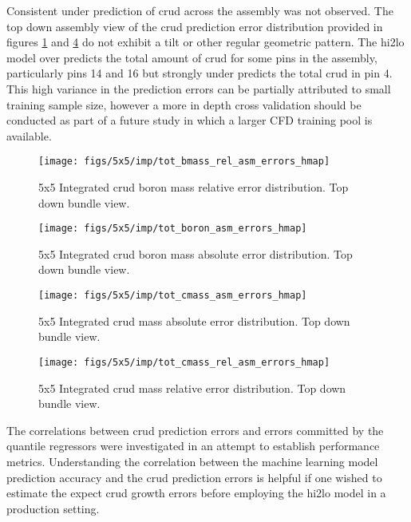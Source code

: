 Consistent under prediction of crud across the assembly was not observed. The top down assembly view of the crud prediction error distribution provided in figures \ref{fig:totbmassrelasmerrorshmap} and \ref{fig:totcmassrelasmerrorshmap} do not exhibit a tilt or other regular geometric pattern.  The hi2lo model over predicts the total amount of crud for some pins in the assembly, particularly pins 14 and 16 but strongly under predicts the total crud in pin 4.  This high variance in the prediction errors can be partially attributed to small training sample size, however a more in depth cross validation should be conducted as part of a future study in which a larger CFD training pool is available.  

\begin{figure}[H]
    \centering
    \texttt{[image: figs/5x5/imp/tot\_bmass\_rel\_asm\_errors\_hmap]}
    \caption{5x5 Integrated crud boron mass relative error distribution. Top down bundle view.}
    \label{fig:totbmassrelasmerrorshmap}
\end{figure}
\begin{figure}[H]
    \centering
    \texttt{[image: figs/5x5/imp/tot\_boron\_asm\_errors\_hmap]}
    \caption{5x5 Integrated crud boron mass absolute error distribution. Top down bundle view. }
    \label{fig:totboronasmerrorshmap}
\end{figure}
\begin{figure}[H]
    \centering
    \texttt{[image: figs/5x5/imp/tot\_cmass\_asm\_errors\_hmap]}
    \caption{5x5 Integrated crud mass absolute error distribution. Top down bundle view.}
    \label{fig:totcmassasmerrorshmap}
\end{figure}
\begin{figure}[H]
    \centering
    \texttt{[image: figs/5x5/imp/tot\_cmass\_rel\_asm\_errors\_hmap]}
    \caption{5x5 Integrated crud mass relative error distribution. Top down bundle view.}
    \label{fig:totcmassrelasmerrorshmap}
\end{figure}

The correlations between crud prediction errors and errors committed by the quantile regressors were investigated in an attempt to establish performance metrics.  Understanding the correlation between the machine learning model prediction accuracy and the crud prediction errors is helpful if one wished to estimate the expect crud growth errors before employing the hi2lo model in a production setting.


